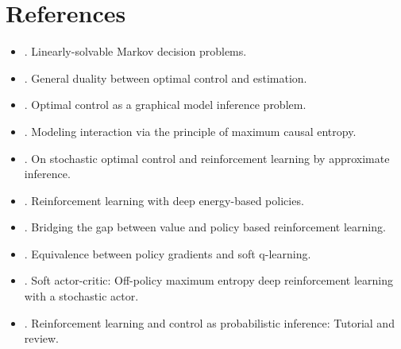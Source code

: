 \section{References}
\begin{itemize}
	\item {}. Linearly-solvable Markov decision problems.
	\item {}. General duality between optimal control and estimation.
	\item {}. Optimal control as a graphical model inference problem.
	\item {}. Modeling interaction via the principle of maximum causal entropy.
	\item {}. On stochastic optimal control and reinforcement learning by approximate inference.
	\item {}. Reinforcement learning with deep energy-based policies.
	\item {}. Bridging the gap between value and policy based reinforcement learning.
	\item {}. Equivalence between policy gradients and soft q-learning.
	\item {}. Soft actor-critic: Off-policy maximum entropy deep reinforcement learning with a stochastic actor.
	\item {}. Reinforcement learning and control as probabilistic inference: Tutorial and review.
\end{itemize}